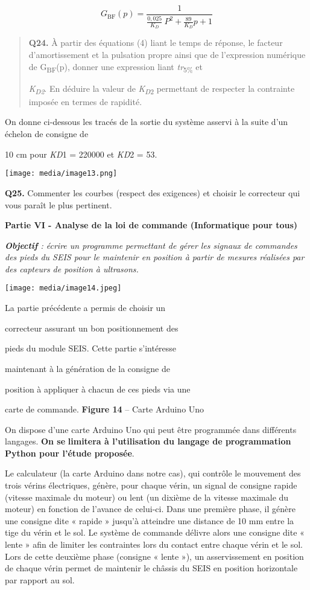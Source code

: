 \documentclass[]{article}
\begin{document}
\[G_{\text{BF}}\left( p \right) = \frac{1}{\frac{0,025}{K_{D}}\ P^{2} + \frac{89}{K_{D}}p + 1}\]

\begin{quote}
\textbf{Q24.} À partir des équations (4) liant le temps de réponse, le
facteur d'amortissement et la pulsation propre ainsi que de l'expression
numérique de G\textsubscript{BF}(p), donner une expression liant
\emph{tr}\textsubscript{5\%} et

\emph{K\textsubscript{D2}}. En déduire la valeur de
\emph{K\textsubscript{D}}\textsubscript{2} permettant de respecter la
contrainte imposée en termes de rapidité.
\end{quote}

On donne ci-dessous les tracés de la sortie du système asservi à la
suite d'un échelon de consigne de

10 cm pour \emph{KD}1 = 220000 et \emph{KD}2 = 53.

\texttt{[image: media/image13.png]}

\protect\hypertarget{page13}{}{}\textbf{Q25.} Commenter les courbes
(respect des exigences) et choisir le correcteur qui vous paraît le plus
pertinent.

\textbf{Partie VI - Analyse de la loi de commande (Informatique pour
tous)}

\emph{\textbf{Objectif} : écrire un programme permettant de gérer les
signaux de commandes des pieds du SEIS pour le maintenir en position à
partir de mesures réalisées par des capteurs de position à ultrasons.}

\texttt{[image: media/image14.jpeg]}

La partie précédente a permis de choisir un

correcteur assurant un bon positionnement des

pieds du module SEIS. Cette partie s'intéresse

maintenant à la génération de la consigne de

position à appliquer à chacun de ces pieds via une

carte de commande. \textbf{Figure 14} -- Carte Arduino Uno

On dispose d'une carte Arduino Uno qui peut être programmée dans
différents langages. \textbf{On se} \textbf{limitera à l'utilisation du
langage de programmation Python pour l'étude proposée}.

Le calculateur (la carte Arduino dans notre cas), qui contrôle le
mouvement des trois vérins électriques, génère, pour chaque vérin, un
signal de consigne rapide (vitesse maximale du moteur) ou lent (un
dixième de la vitesse maximale du moteur) en fonction de l'avance de
celui-ci. Dans une première phase, il génère une consigne dite « rapide
» jusqu'à atteindre une distance de 10 mm entre la tige du vérin et le
sol. Le système de commande délivre alors une consigne dite « lente »
afin de limiter les contraintes lors du contact entre chaque vérin et le
sol. Lors de cette deuxième phase (consigne « lente »), un
asservissement en position de chaque vérin permet de maintenir le
châssis du SEIS en position horizontale par rapport au sol.
\end{document}
